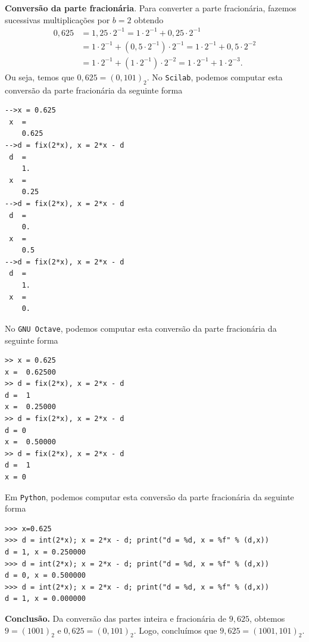 \begin{ex}
{\bf Conversão da parte fracionária}. Para converter a parte fracionária, fazemos sucessivas multiplicações por $b=2$ obtendo
\begin{align}
  0,625 &= 1,25\cdot 2^{-1} = 1\cdot 2^{-1} + 0,25\cdot 2^{-1}\\
  &= 1\cdot 2^{-1} + (0,5\cdot 2^{-1})\cdot 2^{-1} = 1\cdot 2^{-1} + 0,5\cdot 2^{-2}\\
  &= 1\cdot 2^{-1} + (1\cdot 2^{-1})\cdot 2^{-2} = 1\cdot 2^{-1} + 1\cdot 2^{-3}.
\end{align}
Ou seja, temos que $0,625 = (0,101)_2$.
\ifisscilab
No \verb+Scilab+, podemos computar esta conversão da parte fracionária da seguinte forma
\begin{verbatim}
-->x = 0.625
 x  =
    0.625
-->d = fix(2*x), x = 2*x - d
 d  =
    1.
 x  =
    0.25
-->d = fix(2*x), x = 2*x - d
 d  =
    0.
 x  =
    0.5
-->d = fix(2*x), x = 2*x - d
 d  =
    1.
 x  =
    0.
\end{verbatim}
\fi
\ifisoctave
No \verb+GNU Octave+, podemos computar esta conversão da parte fracionária da seguinte forma
\begin{verbatim}
>> x = 0.625
x =  0.62500
>> d = fix(2*x), x = 2*x - d
d =  1
x =  0.25000
>> d = fix(2*x), x = 2*x - d
d = 0
x =  0.50000
>> d = fix(2*x), x = 2*x - d
d =  1
x = 0
\end{verbatim}
\fi
\ifispython
Em \verb+Python+, podemos computar esta conversão da parte fracionária da seguinte forma
\begin{verbatim}
>>> x=0.625
>>> d = int(2*x); x = 2*x - d; print("d = %d, x = %f" % (d,x))
d = 1, x = 0.250000
>>> d = int(2*x); x = 2*x - d; print("d = %d, x = %f" % (d,x))
d = 0, x = 0.500000
>>> d = int(2*x); x = 2*x - d; print("d = %d, x = %f" % (d,x))
d = 1, x = 0.000000
\end{verbatim}
\fi

{\bf Conclusão.} Da conversão das partes inteira e fracionária de $9,625$, obtemos $9 = (1001)_2$ e $0,625 = (0,101)_2$. Logo, concluímos que $9,625 = (1001,101)_2$.
\end{ex}

